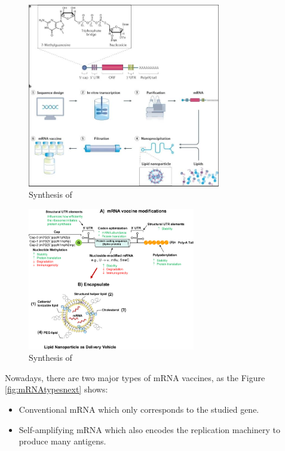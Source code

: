 \documentclass{article}
\begin{document}
                        
            \begin{figure}
                \centering
                \includegraphics[width=0.75\textwidth]{imgs/mRNA_Vaccine.JPG}
                \caption{Synthesis of \autocite{MRNAVaccinesInfectious}}
                \label{fig:mRNAvac}
            \end{figure}
            
            \begin{figure}
                \centering
                \includegraphics[width=0.65\textwidth]{imgs/RNA2.jpg}
                \caption{Synthesis of \autocite{granados-riveronEngineeringCurrentNucleosidemodified2021}}
                \label{fig:mRNAvac_detail}
            \end{figure}

            Nowadays, there are two major types of mRNA vaccines, as the Figure \ref{fig:mRNAtypesnext} shows:
            \begin{itemize}
                \item Conventional mRNA which only corresponds to the studied gene.
                \item Self-amplifying mRNA which also encodes the replication machinery to produce many antigens.
            \end{itemize}
            
\end{document}
